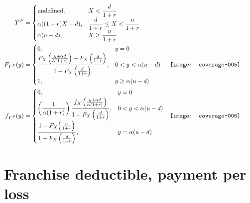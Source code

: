 \documentclass{article}
\newcommand{\D}{\displaystyle}
\begin{document}
\begin{align*}
  Y^P
  &=
  \begin{cases}
    \text{undefined},
      & X < \D \frac{d}{1 + r} \\
    \alpha ((1 + r) X - d),
      & \D\frac{d}{1 + r} \leq X < \frac{u}{1 + r} \\
    \alpha (u - d),
      & \D X \geq \frac{u}{1 + r}
  \end{cases} & \\
  F_{Y^P}(y)
  &=
  \begin{cases}
    0,
      & y = 0 \\
    \D\frac{F_X \left( \frac{y + \alpha d}{\alpha (1 + r)} \right) - F_X
      \left( \frac{d}{1 + r} \right)}{%
      1 - F_X \left( \frac{d}{1 + r} \right)},
      & 0 < y < \alpha (u - d) \\
    1,
      & y \geq \alpha(u - d)
  \end{cases} &
  \begin{minipage}{0.4\linewidth}
\texttt{[image: coverage-005]}
  \end{minipage} \\
  f_{Y^P}(y)
  &=
  \begin{cases}
    0,
      & y = 0 \\
    \left( \D\frac{1}{\alpha (1 + r)} \right)
    \D\frac{f_X \left( \frac{y + \alpha d}{\alpha(1 + r)} \right)}{%
      1 - F_X \left( \frac{d}{1 + r} \right)},
      & 0 < y < \alpha (u - d) \\
    \D\frac{1 - F_X \Big( \frac{u}{1 + r} \Big)}{%
      1 - F_X \left( \frac{d}{1 + r} \right)},
      & y = \alpha(u - d)
  \end{cases} &
  \begin{minipage}{0.4\linewidth}
\texttt{[image: coverage-006]}
  \end{minipage}
\end{align*}



\section{Franchise deductible, payment per loss}
\end{document}

